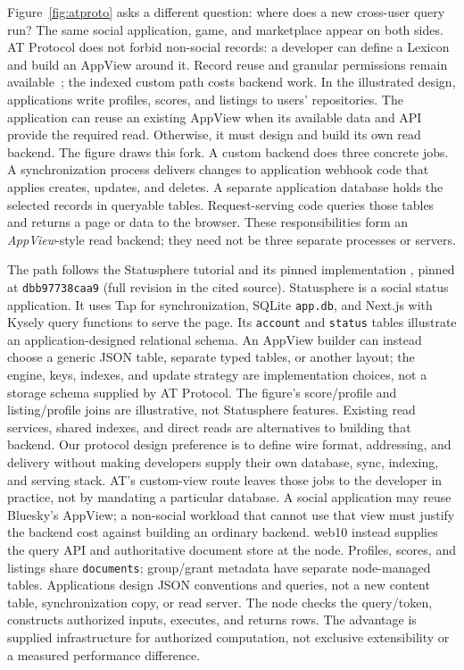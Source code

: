 \documentclass[sigconf, nonacm]{acmart}
\begin{document}
Figure~\ref{fig:atproto} asks a different question: where does a new
cross-user query run? The same social application, game, and marketplace
appear on both sides. AT Protocol does not forbid non-social records:
a developer can define a Lexicon and build an AppView around it. Record
reuse and granular permissions remain available~\cite{at-permissions};
the indexed custom path costs backend work. In the illustrated design,
applications write profiles, scores, and listings to users' repositories.
The application can reuse an existing AppView when its
available data and API provide the required read. Otherwise, it must
design and build its own read backend. The figure draws this fork.
A custom backend does three concrete jobs.
A synchronization process delivers changes to application webhook code
that applies creates, updates, and deletes. A separate application
database holds the selected records in queryable tables. Request-serving
code queries those tables and returns a page or data to the browser.
These responsibilities form an \emph{AppView}-style read backend; they
need not be three separate processes or servers.

The path follows the Statusphere tutorial and its pinned implementation
\cite{at-statusphere,at-statusphere-source}, pinned at
\texttt{dbb97738caa9} (full revision in the cited source).
Statusphere is a social status application. It uses Tap for synchronization,
SQLite \texttt{app.db}, and Next.js with Kysely query functions to serve the page.
Its \texttt{account} and \texttt{status} tables illustrate an
application-designed relational schema. An AppView builder can instead
choose a generic JSON table, separate typed tables, or another layout;
the engine, keys, indexes, and update strategy are implementation choices,
not a storage schema supplied by AT Protocol. The figure's score/profile
and listing/profile joins are illustrative, not Statusphere features.
Existing read services, shared indexes, and direct reads are alternatives
to building that backend. Our protocol design preference is to define
wire format, addressing, and delivery without making developers supply
their own database, sync, indexing, and serving stack. AT's custom-view
route leaves those jobs to the developer in practice, not by mandating a
particular database. A social application may reuse Bluesky's AppView;
a non-social workload that cannot use that view must justify the backend
cost against building an ordinary backend. web10 instead supplies the query API and
authoritative document store at the node. Profiles, scores, and listings
share \texttt{documents}; group/grant metadata have separate node-managed
tables. Applications design JSON conventions and queries, not a new
content table, synchronization copy, or read server. The node checks the
query/token, constructs authorized inputs, executes, and returns rows.
The advantage is supplied infrastructure for
authorized computation, not exclusive extensibility or a measured
performance difference.
\end{document}
